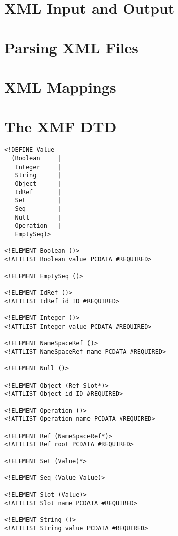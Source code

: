 \documentclass{article}
\begin{document}
\section{XML Input and Output}

\section{Parsing XML Files}

\section{XML Mappings}

\appendix

\section{The XMF DTD}

\label{DTD}

\begin{verbatim}
<!DEFINE Value 
  (Boolean     | 
   Integer     | 
   String      | 
   Object      | 
   IdRef       | 
   Set         |
   Seq         | 
   Null        | 
   Operation   |
   EmptySeq)>

<!ELEMENT Boolean ()>
<!ATTLIST Boolean value PCDATA #REQUIRED> 

<!ELEMENT EmptySeq ()>

<!ELEMENT IdRef ()>
<!ATTLIST IdRef id ID #REQUIRED> 

<!ELEMENT Integer ()>
<!ATTLIST Integer value PCDATA #REQUIRED> 

<!ELEMENT NameSpaceRef ()>
<!ATTLIST NameSpaceRef name PCDATA #REQUIRED> 

<!ELEMENT Null ()>

<!ELEMENT Object (Ref Slot*)>
<!ATTLIST Object id ID #REQUIRED> 

<!ELEMENT Operation ()>
<!ATTLIST Operation name PCDATA #REQUIRED> 

<!ELEMENT Ref (NameSpaceRef*)>
<!ATTLIST Ref root PCDATA #REQUIRED> 

<!ELEMENT Set (Value)*>

<!ELEMENT Seq (Value Value)>

<!ELEMENT Slot (Value)>
<!ATTLIST Slot name PCDATA #REQUIRED> 

<!ELEMENT String ()>
<!ATTLIST String value PCDATA #REQUIRED> 
\end{verbatim}
\end{document}
